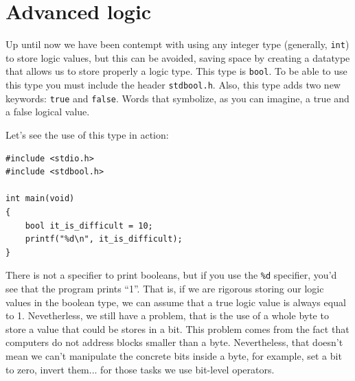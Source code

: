 \documentclass[a4paper]{article}
\begin{document}
\section{Advanced logic}
Up until now we have been contempt with using any integer type (generally,
\verb!int!) to store logic values, but this can be avoided, saving space by
creating a datatype that allows us to store properly a logic type. This type is
\verb!bool!. To be able to use this type you must include the header
\verb!stdbool.h!. Also, this type adds two new keywords: \verb!true! and
\verb!false!. Words that symbolize, as you can imagine, a true and a false
logical value.

Let's see the use of this type in action:

\noindent
\begin{minipage}[H]{\linewidth}
\mbox{}
\begin{lstlisting}[style=C,
caption={Example of us of \texttt{bool}},
label={lst:bool1}]
#include <stdio.h>
#include <stdbool.h>

int main(void)
{
    bool it_is_difficult = 10;
    printf("%d\n", it_is_difficult);
}
\end{lstlisting}
\end{minipage}

There is not a specifier to print booleans, but if you use the \verb!%d!
specifier, you'd see that the program prints ``1''. That is, if we are rigorous
storing our logic values in the boolean type, we can assume that a true logic
value is always equal to 1. Nevetherless, we still have a problem, that is the
use of a whole byte to store a value that could be stores in a bit. This problem
comes from the fact that computers do not address blocks smaller than a byte.
Nevertheless, that doesn't mean we can't manipulate the concrete bits inside a
byte, for example, set a bit to zero, invert them... for those tasks we use
bit-level operators.
\end{document}
